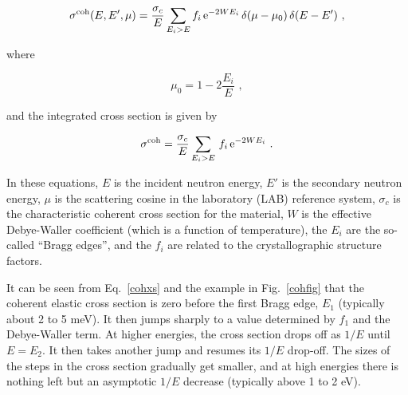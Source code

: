 \begin{equation}
   \sigma^{\rm coh}(E,E',\mu)=\frac{\sigma_c}{E}
     \sum_{E_i>E} f_i\,{\rm e}^{-2WE_i}\,\delta(\mu-\mu_0)
      \,\delta(E-E')\,\,,
\label{coh}
\end{equation}

\noindent
where

\begin{equation}
   \mu_0=1-2\frac{E_i}{E}\,\,,
\end{equation}

\noindent
and the integrated cross section is given by

\begin{equation}
   \sigma^{\rm coh}=\frac{\sigma_c}{E}
      \sum_{E_i>E}\,f_i\,{\rm e}^{-2WE_i}\,\,.
\label{cohxs}
\end{equation}

\noindent
In these equations, $E$ is the incident neutron energy, $E'$ is the
secondary neutron energy, $\mu$ is the scattering cosine in the
laboratory (LAB) reference system, $\sigma_c$ is the characteristic
coherent cross section for the material,
$W$ is the effective Debye-Waller coefficient
(which is a function of temperature), the $E_i$ are the so-called
``Bragg edges'',  and the $f_i$ are related to
the crystallographic structure factors.

It can be seen from Eq.~\ref{cohxs} and the example in Fig.~\ref{cohfig}
that the coherent elastic cross section is zero before the first Bragg edge,
$E_1$ (typically about 2 to 5 meV).  It then jumps sharply to a value
determined by $f_1$ and the Debye-Waller term.  At higher energies, the
cross section drops off as $1/E$ until $E{=}E_2$.  It then takes another
jump and resumes its $1/E$ drop-off.  The sizes of the steps in the cross
section gradually get smaller, and at high energies there is nothing left
but an asymptotic $1/E$ decrease (typically above 1 to 2 eV).

